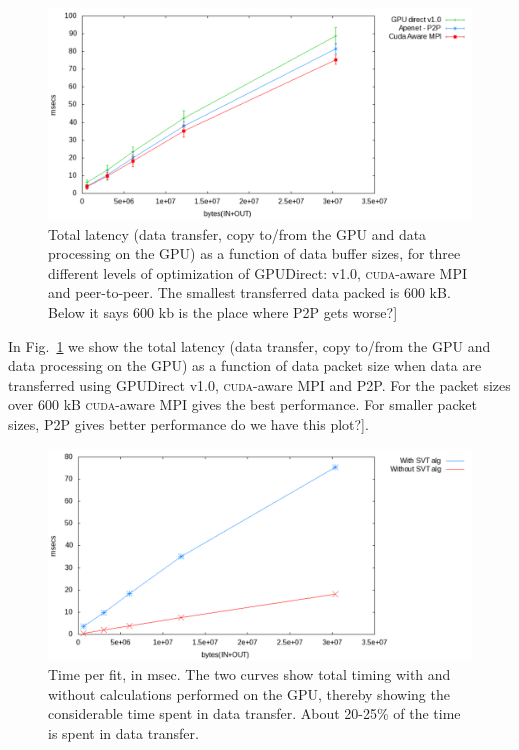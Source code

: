 \documentclass[letterpaper]{jpconf}
\providecommand{\fixme}[1]{\xspace{\sffamily{[\bfseries{}FIXME:} #1]}}
\begin{document}
\begin{figure}[tbp]
  \centering
  \includegraphics[width=0.9\linewidth]{figures/datatransfer}
  \caption{Total latency (data transfer, copy to/from the GPU and data
    processing on the GPU) as a function of data buffer sizes, for
    three different levels of optimization of GPUDirect: v1.0,
    \textsc{cuda}-aware MPI and peer-to-peer. The smallest transferred
    data packed is 600 kB. \fixme{Below it says 600 kb is the place where
    P2P gets worse?}}
  \label{fig:xferlatency}
\end{figure}

In Fig.~\ref{fig:xferlatency} we show the total latency (data
transfer, copy to/from the GPU and data processing on the GPU) as a
function of data packet size when data are transferred using GPUDirect
v1.0, \textsc{cuda}-aware MPI and P2P. For the packet sizes over 600
kB \textsc{cuda}-aware MPI gives the best performance. For smaller
packet sizes, P2P gives better performance \fixme{do we have this plot?}.


\begin{figure}[tbp]
  \centering
  \includegraphics[width=0.9\linewidth]{figures/cudaware}
  \caption{Time per fit, in msec. The two curves show total timing
    with and without calculations performed on the GPU, thereby
    showing the considerable time spent in data transfer. About
    20-25\% of the time is spent in data transfer.}
  \label{fig:transferOnly}
\end{figure}
\end{document}
